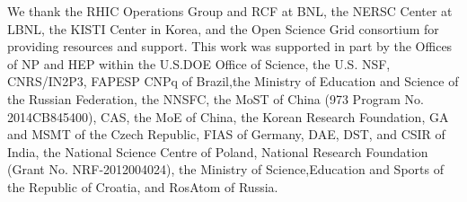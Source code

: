 \documentclass[twocolumn,showpacs,amsmath,amssymb,superscriptaddress,nofootinbib]{revtex4-1}
\begin{document}
We thank the RHIC Operations Group and RCF at BNL, the NERSC Center at LBNL, the KISTI Center in Korea,
and the Open Science Grid consortium for providing resources and support. This work was supported in part
by the Offices of NP and HEP within the U.S.DOE Office of Science, the U.S. NSF, CNRS/IN2P3, FAPESP CNPq of
Brazil,the Ministry of Education and Science of the Russian Federation, the NNSFC, the MoST of China (973 Program
No. 2014CB845400), CAS, the MoE of China, the Korean Research Foundation, GA and MSMT of the Czech
Republic, FIAS of Germany, DAE, DST, and CSIR of India, the National Science Centre of Poland, National
Research Foundation (Grant No. NRF-2012004024), the Ministry of Science,Education and Sports of the Republic of
Croatia, and RosAtom of Russia.



\end{document}
